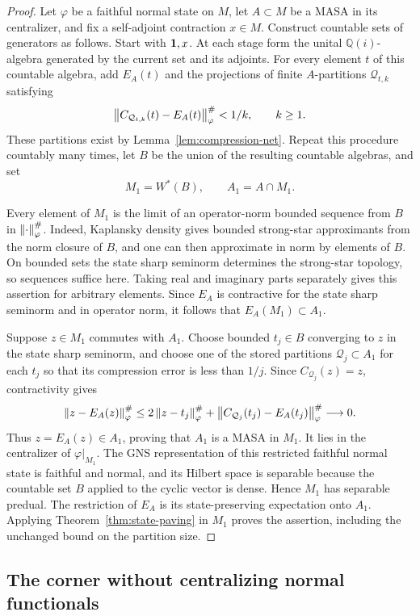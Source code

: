 \begin{proof}
Let $\varphi$ be a faithful normal state on $M$, let $A\subset M$ be a
MASA in its centralizer, and fix a self-adjoint contraction $x\in M$.
Construct countable sets of generators as follows. Start with $\mathbf 1,x$.
At each stage form the unital $\mathbb Q(i)$-algebra generated by the
current set and its adjoints. For every element $t$ of this countable
algebra, add $E_A(t)$ and the projections of finite $A$-partitions
$\mathcal Q_{t,k}$ satisfying
\[
 \left\lVert C_{\mathcal Q_{t,k}}(t)-E_A(t)\right\rVert_\varphi^\#<1/k,
 \qquad k\geq1.
\]
These partitions exist by Lemma~\ref{lem:compression-net}. Repeat this
procedure countably many times, let $B$ be the union of the resulting
countable algebras, and set
\[
 M_1=W^*(B),\qquad A_1=A\cap M_1.
\]

Every element of $M_1$ is the limit of an operator-norm bounded sequence
from $B$ in $\left\lVert\cdot\right\rVert_\varphi^\#$. Indeed, Kaplansky density gives
bounded strong-star approximants from the norm closure of $B$, and one
can then approximate in norm by elements of $B$. On bounded sets the
state sharp seminorm determines the strong-star topology, so sequences
suffice here. Taking real and imaginary parts separately gives this
assertion for arbitrary elements. Since $E_A$ is contractive for the
state sharp seminorm and in operator norm, it follows that
$E_A(M_1)\subset A_1$.

Suppose $z\in M_1$ commutes with $A_1$. Choose bounded $t_j\in B$
converging to $z$ in the state sharp seminorm, and choose one of the
stored partitions $\mathcal Q_j\subset A_1$ for each $t_j$ so that its
compression error is less than $1/j$. Since $C_{\mathcal Q_j}(z)=z$,
contractivity gives
\[
 \left\lVert z-E_A(z)\right\rVert_\varphi^\#
 \leq 2\left\lVert z-t_j\right\rVert_\varphi^\#
       +\left\lVert C_{\mathcal Q_j}(t_j)-E_A(t_j)\right\rVert_\varphi^\#
 \longrightarrow0.
\]
Thus $z=E_A(z)\in A_1$, proving that $A_1$ is a MASA in $M_1$.
It lies in the centralizer of $\varphi|_{M_1}$. The GNS representation
of this restricted faithful normal state is faithful and normal, and
its Hilbert space is separable because the countable set $B$ applied
to the cyclic vector is dense. Hence $M_1$ has separable predual.
The restriction of $E_A$ is its state-preserving expectation onto
$A_1$. Applying Theorem~\ref{thm:state-paving} in $M_1$ proves the
assertion, including the unchanged bound on the partition size.
\end{proof}

\subsection{The corner without centralizing normal functionals}

